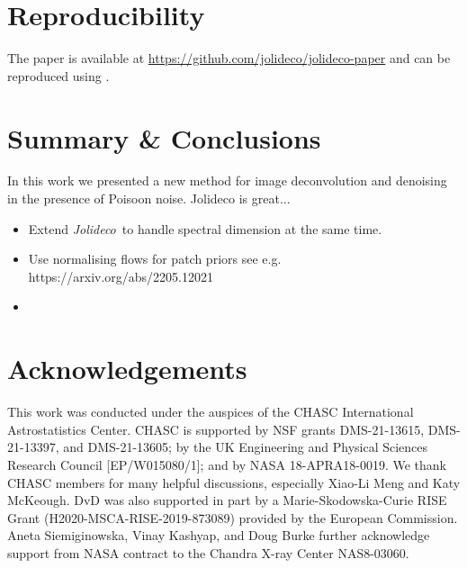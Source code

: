 \documentclass[twocolumn]{aastex631}
\newcommand{\jolideco}{\textit{Jolideco}~}
\begin{document}
    \section{Reproducibility}

    The paper is available at \url{https://github.com/jolideco/jolideco-paper} and can be reproduced using \cite{Luger2021}.
    
    


    \section{Summary \& Conclusions}
    In this work we presented a new method for image deconvolution and denoising in the presence of Poisoon noise.
    Jolideco is great...

    \begin{itemize}
        \item Extend \jolideco to handle spectral dimension at the same time.
        \item Use normalising flows for patch priors see e.g. https://arxiv.org/abs/2205.12021
        \item 
    \end{itemize}
    

    \section*{Acknowledgements}
    This work was conducted under the auspices of the CHASC International Astrostatistics Center.
    CHASC is supported by NSF grants DMS-21-13615, DMS-21-13397, and DMS-21-13605; by the UK Engineering
    and Physical Sciences Research Council [EP/W015080/1]; and by NASA 18-APRA18-0019.
    We thank CHASC members for many helpful discussions, especially Xiao-Li Meng and Katy McKeough.
    DvD was also supported in part by a Marie-Skodowska-Curie RISE Grant (H2020-MSCA-RISE-2019-873089)
    provided by the European Commission.
    Aneta Siemiginowska, Vinay Kashyap, and Doug Burke further acknowledge support from NASA
    contract to the Chandra X-ray Center NAS8-03060.

    \newpage
    
\end{document}
